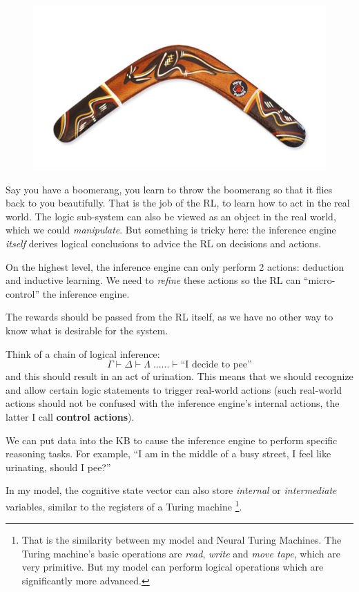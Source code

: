 \documentclass[12pt]{article}
\begin{document}
\begin{figure}[H]
\centering
\includegraphics[scale=0.5]{boomerang.jpg}
\end{figure}

Say you have a boomerang, you learn to throw the boomerang so that it flies back to you beautifully.  That is the job of the RL, to learn how to act in the real world.  The logic sub-system can also be viewed as an object in the real world, which we could \textit{manipulate}.  But something is tricky here: the inference engine \textit{itself} derives logical conclusions to advice the RL on decisions and actions.  

On the highest level, the inference engine can only perform 2 actions:  deduction and inductive learning.  We need to \textit{refine} these actions so the RL can ``micro-control'' the inference engine.

The rewards should be passed from the RL itself, as we have no other way to know what is desirable for the system.

Think of a chain of logical inference:
$$ \Gamma \vdash \Delta \vdash \Lambda \; ... ... \vdash \mbox{``I decide to pee''} $$
and this should result in an act of urination.  This means that we should recognize and allow certain logic statements to trigger real-world actions (such real-world actions should not be confused with the inference engine's internal actions, the latter I call \textbf{control actions}).

We can put data into the KB to cause the inference engine to perform specific reasoning tasks.  For example, ``I am in the middle of a busy street, I feel like urinating, should I pee?''

In my model, the cognitive state vector can also store \textit{internal} or \textit{intermediate} variables, similar to the registers of a Turing machine \footnote{That is the similarity between my model and Neural Turing Machines. The Turing machine's basic operations are \textit{read}, \textit{write} and \textit{move tape}, which are very primitive.  But my model can perform logical operations which are significantly more advanced.}.  
\end{document}
